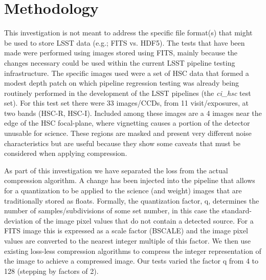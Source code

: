 \section{Methodology}

This investigation is not meant to address the specific file format(s) that might be
used to store LSST data (e.g.; FITS vs. HDF5).  The tests that have been made were performed
using images stored using FITS, mainly because the changes necessary could be used within 
the current LSST pipeline testing infrastructure.  The specific images used were a set of
HSC data that formed a modest depth patch on which pipeline regression testing was already 
being routinely performed in the development of the LSST pipelines (the {\it ci\_hsc} test set).  
For this test set there were 33 images/CCDs, from 11 visit/exposures, at two bands (HSC-R, HSC-I).
Included among these images are a 4 images near the edge of the HSC focal-plane, where 
vignetting causes a portion of the detector unusable for science.  These regions are 
masked and present very different noise characteristics but are useful because they show some 
caveats that must be considered when applying compression.

As part of this investigation we have separated the loss from the actual compression algorithm.
A change has been injected into the pipeline that allows for a quantization to be applied
to the science (and weight) images that are traditionally stored as floats.  Formally,
the quantization factor, q, determines the number of samples/subdivisions of some set
number, in this case the standard-deviation of the image pixel values that do not contain a 
detected source.  For a FITS image this is expressed as a scale factor (BSCALE) and the image 
pixel values are converted to the nearest integer multiple of this factor.  We then use existing
loss-less compression algorithms to compress the integer representation of the image
to achieve a compressed image.  Our tests varied the factor q from 4 to 128 (stepping by 
factors of 2).

